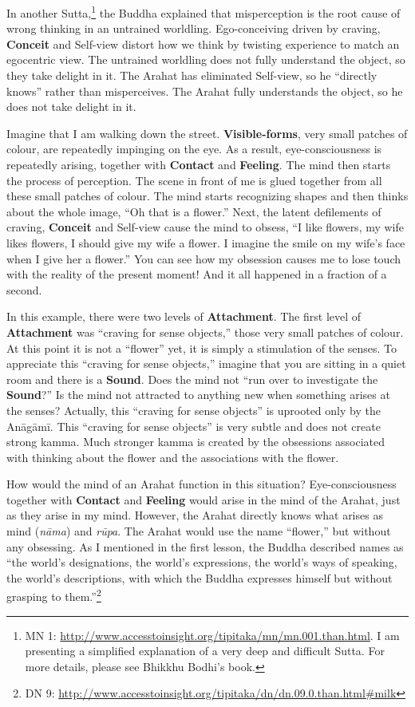 In another Sutta,\footnote{MN 1: \url{http://www.accesstoinsight.org/tipitaka/mn/mn.001.than.html}. I am presenting a simplified explanation of a very deep and difficult Sutta. For more details, please see Bhikkhu Bodhi's book.} the Buddha explained that misperception is the root cause of wrong thinking in an untrained worldling. Ego-conceiving driven by craving, \textbf{Conceit} and Self-view distort how we think by twisting experience to match an egocentric view. The untrained worldling does not fully understand the object, so they take delight in it. The Arahat has eliminated Self-view, so he “directly knows” rather than misperceives. The Arahat fully understands the object, so he does not take delight in it.

Imagine that I am walking down the street. \textbf{Visible-forms}, very small patches of colour, are repeatedly impinging on the eye. As a result, eye-consciousness is repeatedly arising, together with \textbf{Contact} and \textbf{Feeling}. The mind then starts the process of perception. The scene in front of me is glued together from all these small patches of colour. The mind starts recognizing shapes and then thinks about the whole image, “Oh that is a flower.” Next, the latent defilements of craving, \textbf{Conceit} and Self-view cause the mind to obsess, “I like flowers, my wife likes flowers, I should give my wife a flower. I imagine the smile on my wife’s face when I give her a flower.” You can see how my obsession causes me to lose touch with the reality of the present moment! And it all happened in a fraction of a second.

\pagebreak

In this example, there were two levels of \textbf{Attachment}. The first level of \textbf{Attachment} was “craving for sense objects,” those very small patches of colour. At this point it is not a “flower” yet, it is simply a stimulation of the senses. To appreciate this “craving for sense objects,” imagine that you are sitting in a quiet room and there is a \textbf{Sound}. Does the mind not “run over to investigate the \textbf{Sound}?” Is the mind not attracted to anything new when something arises at the senses? Actually, this “craving for sense objects” is uprooted only by the Anāgāmī. This “craving for sense objects” is very subtle and does not create strong kamma. Much stronger kamma is created by the obsessions associated with thinking about the flower and the associations with the flower.

How would the mind of an Arahat function in this situation? Eye-consciousness together with \textbf{Contact} and \textbf{Feeling} would arise in the mind of the Arahat, just as they arise in my mind. However, the Arahat directly knows what arises as mind (\textit{nāma}) and \textit{rūpa}. The Arahat would use the name “flower,” but without any obsessing. As I mentioned in the first lesson, the Buddha described names as “the world’s designations, the world’s expressions, the world’s ways of speaking, the world’s descriptions, with which the Buddha expresses himself but without grasping to them.”\footnote{DN 9: \url{http://www.accesstoinsight.org/tipitaka/dn/dn.09.0.than.html\#milk}}

